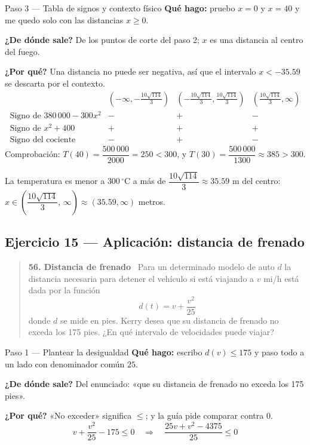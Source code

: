 \documentclass[11pt]{article}
\begin{document}
\begin{paso}{Paso 3 --- Tabla de signos y contexto físico}
\textbf{Qué hago:} pruebo $x=0$ y $x=40$ y me quedo solo con las distancias $x\ge 0$.

\textbf{¿De dónde sale?} De los puntos de corte del paso 2; $x$ es una distancia al centro del fuego.

\textbf{¿Por qué?} Una distancia no puede ser negativa, así que el intervalo $x<-35.59$ se descarta por el contexto.
\[
\begin{array}{l|ccc}
 & \left(-\infty,-\tfrac{10\sqrt{114}}{3}\right) & \left(-\tfrac{10\sqrt{114}}{3},\tfrac{10\sqrt{114}}{3}\right) & \left(\tfrac{10\sqrt{114}}{3},\infty\right)\\\hline
\text{Signo de } 380\,000-300x^2 & - & + & -\\
\text{Signo de } x^2+400 & + & + & +\\\hline
\text{Signo del cociente} & - & + & -
\end{array}
\]
Comprobación: $T(40)=\dfrac{500\,000}{2000}=250<300$, y $T(30)=\dfrac{500\,000}{1300}\approx 385>300$.
\end{paso}

\begin{resp}
La temperatura es menor a $300\,^\circ$C a más de $\dfrac{10\sqrt{114}}{3}\approx 35.59$ m del centro: $x\in\left(\dfrac{10\sqrt{114}}{3},\,\infty\right)\approx(35.59,\infty)$ metros.
\end{resp}

\subsection*{Ejercicio 15 — Aplicación: distancia de frenado}

\begin{quote}
\textbf{56. Distancia de frenado} \ Para un determinado modelo de auto $d$ la distancia necesaria para detener el vehículo si está viajando a $v$ mi/h está dada por la función
\[
d(t)=v+\frac{v^2}{25}
\]
donde $d$ se mide en pies. Kerry desea que su distancia de frenado no exceda los 175 pies. ¿En qué intervalo de velocidades puede viajar?
\end{quote}

\begin{paso}{Paso 1 --- Plantear la desigualdad}
\textbf{Qué hago:} escribo $d(v)\le 175$ y paso todo a un lado con denominador común $25$.

\textbf{¿De dónde sale?} Del enunciado: «que su distancia de frenado no exceda los 175 pies».

\textbf{¿Por qué?} «No exceder» significa $\le$; y la guía pide comparar contra $0$.
\[
v+\frac{v^2}{25}-175\le 0
\quad\Longrightarrow\quad
\frac{25v+v^2-4375}{25}\le 0
\]
\end{paso}
\end{document}
